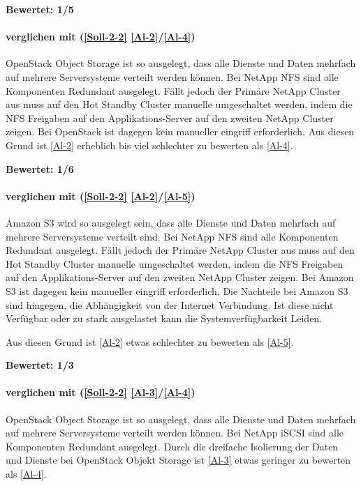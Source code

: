 \textbf{Bewertet: 1/5}

\paragraph*{  verglichen mit  (\ref{Soll-2-2} \ref{Al-2}/\ref{Al-4})}
OpenStack Object Storage ist so ausgelegt, dass alle Dienste und Daten mehrfach auf mehrere Serversysteme verteilt werden können. Bei NetApp NFS sind alle Komponenten Redundant ausgelegt. Fällt jedoch der Primäre NetApp Cluster aus muss auf den Hot Standby Cluster manuelle umgeschaltet werden, indem die NFS Freigaben auf den Applikations-Server auf den zweiten NetApp Cluster zeigen. Bei OpenStack ist dagegen kein manueller eingriff erforderlich. Aus diesen Grund ist  \ref{Al-2} erheblich bis viel schlechter zu bewerten als  \ref{Al-4}.

\textbf{Bewertet: 1/6}

\paragraph*{  verglichen mit  (\ref{Soll-2-2} \ref{Al-2}/\ref{Al-5})}
Amazon S3 wird so ausgelegt sein, dass alle Dienste und Daten mehrfach auf mehrere Serversysteme verteilt sind. Bei NetApp NFS sind alle Komponenten Redundant ausgelegt. Fällt jedoch der Primäre NetApp Cluster aus muss auf den Hot Standby Cluster manuelle umgeschaltet werden, indem die NFS Freigaben auf den Applikations-Server auf den zweiten NetApp Cluster zeigen. Bei Amazon S3 ist dagegen kein manueller eingriff erforderlich. Die Nachteile bei Amazon S3 sind hingegen, die Abhängigkeit von der Internet Verbindung. Ist diese nicht Verfügbar oder zu stark ausgelastet kann die Systemverfügbarkeit Leiden.

Aus diesen Grund ist  \ref{Al-2} etwas schlechter zu bewerten als  \ref{Al-5}.

\textbf{Bewertet: 1/3}

\paragraph*{  verglichen mit  (\ref{Soll-2-2} \ref{Al-3}/\ref{Al-4})}
OpenStack Object Storage ist so ausgelegt, dass alle Dienste und Daten mehrfach auf mehrere Serversysteme verteilt werden können. Bei NetApp iSCSI sind alle Komponenten Redundant ausgelegt. Durch die dreifache Isolierung der Daten und Dienste bei OpenStack Objekt Storage ist  \ref{Al-3} etwas geringer zu bewerten als  \ref{Al-4}.

